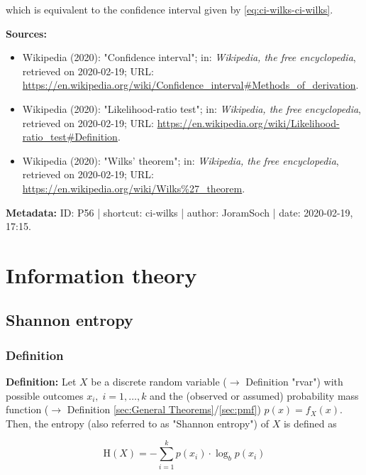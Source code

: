 \documentclass[a4paper,12pt]{book}
\begin{document}
which is equivalent to the confidence interval given by \eqref{eq:ci-wilks-ci-wilks}.

\vspace{1em}
\textbf{Sources:}
\begin{itemize}
\item Wikipedia (2020): "Confidence interval"; in: \textit{Wikipedia, the free encyclopedia}, retrieved on 2020-02-19; URL: \url{https://en.wikipedia.org/wiki/Confidence_interval#Methods_of_derivation}.
\item Wikipedia (2020): "Likelihood-ratio test"; in: \textit{Wikipedia, the free encyclopedia}, retrieved on 2020-02-19; URL: \url{https://en.wikipedia.org/wiki/Likelihood-ratio_test#Definition}.
\item Wikipedia (2020): "Wilks' theorem"; in: \textit{Wikipedia, the free encyclopedia}, retrieved on 2020-02-19; URL: \url{https://en.wikipedia.org/wiki/Wilks%27_theorem}.
\end{itemize}


\vspace{1em}
\textbf{Metadata:} ID: P56 | shortcut: ci-wilks | author: JoramSoch | date: 2020-02-19, 17:15.


\pagebreak
\section{Information theory}

\subsection{Shannon entropy}

\subsubsection[\textit{Definition}]{Definition} \label{sec:ent}

\vspace{1em}
\textbf{Definition:} Let $X$ be a discrete random variable ($\rightarrow$ Definition "rvar") with possible outcomes $x_i, \; i = 1,\ldots,k$ and the (observed or assumed) probability mass function ($\rightarrow$ Definition \ref{sec:General Theorems}/\ref{sec:pmf}) $p(x) = f_X(x)$. Then, the entropy (also referred to as "Shannon entropy") of $X$ is defined as

\begin{equation} \label{eq:ent-ent}
\mathrm{H}(X) = - \sum_{i=1}^{k} p(x_i) \cdot \log_b p(x_i)
\end{equation}
\end{document}
